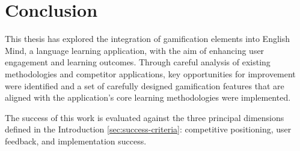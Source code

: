\chapter{Conclusion}
\label{chap:conclusion}

This thesis has explored the integration of gamification elements into English Mind, a language learning application, with the aim of enhancing user engagement and learning outcomes. Through careful analysis of existing methodologies and competitor applications, key opportunities for improvement were identified and a set of carefully designed gamification features that are aligned with the application's core learning methodologies were implemented. 

The success of this work is evaluated against the three principal dimensions defined in the Introduction \ref{sec:success-criteria}: competitive positioning, user feedback, and implementation success.

